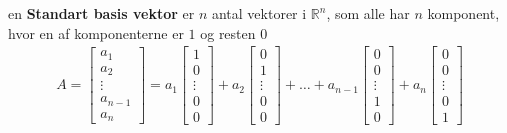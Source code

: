 \begin{defn}
en \textbf{Standart basis vektor} er $n$ antal vektorer i $\mathds{R}^n$, som alle har $n$ komponent, hvor en af komponenterne er $1$ og resten $0$
\begin{align*}
A=
\begin{bmatrix}
a_1\\
a_2\\
\vdots\\
a_{n-1}\\
a_n
\end{bmatrix}=
a_1
\begin{bmatrix}
1\\
0\\
\vdots\\
0\\
0
\end{bmatrix}
+
a_2
\begin{bmatrix}
0\\
1\\
\vdots\\
0\\
0
\end{bmatrix}
+
\dots
+a_{n-1}
\begin{bmatrix}
0\\
0\\
\vdots\\
1\\
0
\end{bmatrix}
+
a_n
\begin{bmatrix}
0\\
0\\
\vdots\\
0\\
1
\end{bmatrix}
\end{align*}
\end{defn}